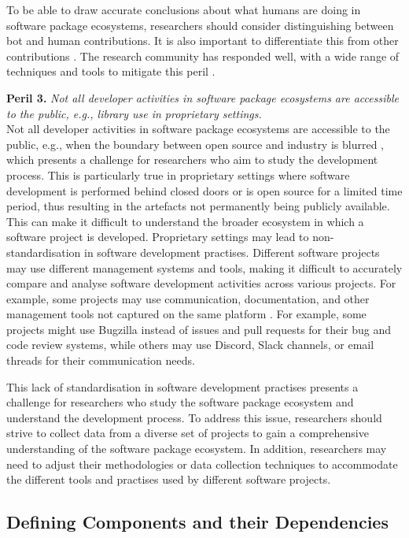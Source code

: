To be able to draw accurate conclusions about what humans are doing in software package ecosystems, researchers should consider distinguishing between bot and human contributions.
It is also important to differentiate this from other contributions \cite{maeprasart2022understanding}.
The research community has responded well, with a wide range of techniques and tools to mitigate this peril \cite{Bodegha2021, golzadeh2022accuracy}.

\smallskip\noindent\textbf{Peril 3.}\textit{
Not all developer activities in software package ecosystems are accessible to the public, e.g., library use in proprietary settings.
}\\

Not all developer activities in software package ecosystems are accessible to the public, e.g., when the boundary between open source and industry is blurred \cite{stol2014inner}, which presents a challenge for researchers who aim to study the development process. This is particularly true in proprietary settings where software development is performed behind closed doors or is open source for a limited time period, thus resulting in the artefacts not permanently being publicly available.
This can make it difficult to understand the broader ecosystem in which a software project is developed.
Proprietary settings may lead to non-standardisation in software development practises. Different software projects may use different management systems and tools, making it difficult to accurately compare and analyse software development activities across various projects. For example, some projects may use communication, documentation, and other management tools not captured on the same platform \cite{montgomery2022alternative}. For example, some projects might use Bugzilla instead of issues and pull requests for their bug and code review systems, while others may use Discord, Slack channels, or email threads for their communication needs.

This lack of standardisation in software development practises presents a challenge for researchers who study the software package ecosystem and understand the development process. To address this issue, researchers should strive to collect data from a diverse set of projects to gain a comprehensive understanding of the software package ecosystem. In addition, researchers may need to adjust their methodologies or data collection techniques to accommodate the different tools and practises used by different software projects.

\subsection{Defining Components and their Dependencies}

